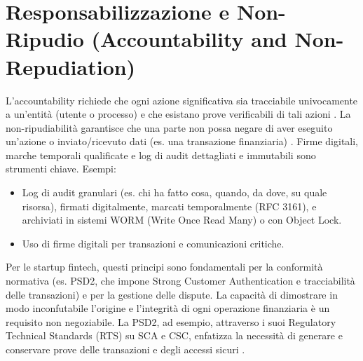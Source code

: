 \section{Responsabilizzazione e Non-Ripudio (Accountability and Non-Repudiation)}
L'accountability richiede che ogni azione significativa sia tracciabile univocamente a un'entità (utente o processo) e che esistano prove verificabili di tali azioni \cite{Feigenbaum_2020_Accountability}. La non-ripudiabilità garantisce che una parte non possa negare di aver eseguito un'azione o inviato/ricevuto dati (es. una transazione finanziaria) \cite{NIST_Glossary_NonRepudiation}. Firme digitali, marche temporali qualificate e log di audit dettagliati e immutabili sono strumenti chiave.
Esempi:
\begin{itemize}
\item Log di audit granulari (es. chi ha fatto cosa, quando, da dove, su quale risorsa), firmati digitalmente, marcati temporalmente (RFC 3161), e archiviati in sistemi WORM (Write Once Read Many) o con Object Lock.
\item Uso di firme digitali per transazioni e comunicazioni critiche.
\end{itemize}
Per le startup fintech, questi principi sono fondamentali per la conformità normativa (es. PSD2, che impone Strong Customer Authentication e tracciabilità delle transazioni) e per la gestione delle dispute. La capacità di dimostrare in modo inconfutabile l'origine e l'integrità di ogni operazione finanziaria è un requisito non negoziabile. La PSD2, ad esempio, attraverso i suoi Regulatory Technical Standards (RTS) su SCA e CSC, enfatizza la necessità di generare e conservare prove delle transazioni e degli accessi sicuri \cite{EBA_RTS_SCA_CSC}.
